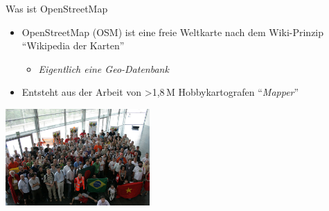 \documentclass{beamer}
\begin{document}
\begin{frame}{Was ist OpenStreetMap}

\begin{itemize}
  \item OpenStreetMap (OSM) ist eine freie Weltkarte nach dem Wiki-Prinzip "`Wikipedia der Karten"'
    \begin{itemize}
      \item \emph{Eigentlich eine Geo-Datenbank}
    \end{itemize}
\pause
  \item Entsteht aus der Arbeit von \textgreater 1,8\,M Hobbykartografen "`\emph{Mapper}"'

\end{itemize}


 \begin{center}
 \includegraphics[width=5.5cm]{sotm.jpg}
 \end{center}

\end{frame}
\end{document}
